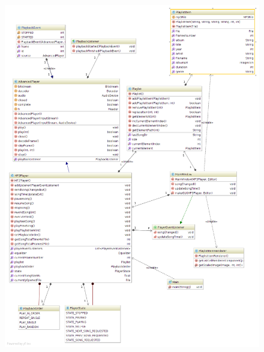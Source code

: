 \documentclass[12pt,a4paper,notitlepage]{article}
\begin{document}
\begin{figure}[hb]
 \centering
 \includegraphics[width=1.1\textwidth]{img/diagram.png}
\end{figure}
\end{document}

